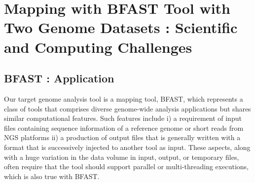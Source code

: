 \documentclass[12pt]{article}
\begin{document}


\section{Mapping with BFAST Tool with Two Genome Datasets : Scientific and Computing Challenges}
\subsection{BFAST : Application}

Our target genome analysis tool is a mapping tool, BFAST\cite{bfast2009,bfast2009b}, which represents a class of tools that comprises diverse genome-wide analysis applications but shares similar computational features.  Such features include i) a requirement of input files containing sequence information of a reference genome or short reads from NGS platforms ii) a production of output files that is generally written with a format that is successively injected to another tool as input.  These aspects, along with a huge variation in the data volume in input, output, or temporary files, often require that the tool should support parallel or multi-threading executions, which is also true with BFAST\cite{bfast2009}.  
\end{document}
